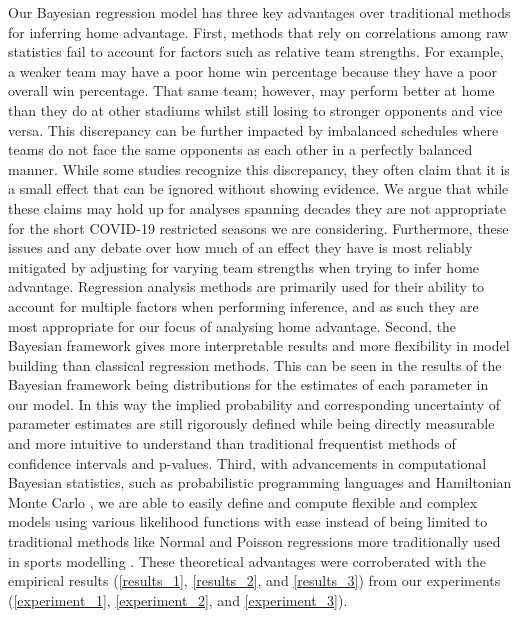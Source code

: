 Our Bayesian regression model has three key advantages over traditional methods for inferring home advantage. First, methods that rely on correlations among raw statistics fail to account for factors such as relative team strengths. For example, a weaker team may have a poor home win percentage because they have a poor overall win percentage. That same team; however, may perform better at home than they do at other stadiums whilst still losing to stronger opponents and vice versa. This discrepancy can be further impacted by imbalanced schedules where teams do not face the same opponents as each other in a perfectly balanced manner. While some studies recognize this discrepancy, they often claim that it is a small effect that can be ignored \cite{Pollard2005a} without showing evidence. We argue that while these claims may hold up for analyses spanning decades they are not appropriate for the short COVID-19 restricted seasons we are considering. Furthermore, these issues and any debate over how much of an effect they have is most reliably mitigated by adjusting for varying team strengths when trying to infer home advantage. Regression analysis methods are primarily used for their ability to account for multiple factors when performing inference, and as such they are most appropriate for our focus of analysing home advantage. Second, the Bayesian framework gives more interpretable results and more flexibility in model building than classical regression methods. This can be seen in the results of the Bayesian framework being distributions for the estimates of each parameter in our model. In this way the implied probability and corresponding uncertainty of parameter estimates are still rigorously defined while being directly measurable and more intuitive to understand than traditional frequentist methods of confidence intervals and p-values. Third, with advancements in computational Bayesian statistics, such as probabilistic programming languages \cite{pymc3} and Hamiltonian Monte Carlo \cite{Betancourt2017}, we are able to easily define and compute flexible and complex models using various likelihood functions with ease instead of being limited to traditional methods like Normal and Poisson regressions more traditionally used in sports modelling \cite{Lopez2018} \cite{Glickman1998} \cite{Karlis2003} \cite{Baio2010} \cite{Benz2020}. These theoretical advantages were corroberated with the empirical results (\ref{results_1}, \ref{results_2}, and \ref{results_3}) from our experiments (\ref{experiment_1}, \ref{experiment_2}, and \ref{experiment_3}).

